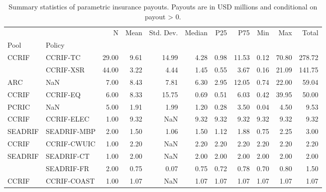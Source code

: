\begin{table}
\caption{Summary statistics of parametric insurance payouts. Payouts are in USD millions and conditional on payout > 0.}
\label{tab:summary_by_pool_policy}
\begin{tabular}{llrrrrrrrrr}
\toprule
 &  & N & Mean & Std. Dev. & Median & P25 & P75 & Min & Max & Total \\
Pool & Policy &  &  &  &  &  &  &  &  &  \\
\midrule
\multirow[t]{2}{*}{CCRIF} & CCRIF-TC & 29.00 & 9.61 & 14.99 & 4.28 & 0.98 & 11.53 & 0.12 & 70.80 & 278.72 \\
 & CCRIF-XSR & 44.00 & 3.22 & 4.44 & 1.45 & 0.55 & 3.67 & 0.16 & 21.09 & 141.75 \\
\cline{1-11}
ARC & NaN & 7.00 & 8.43 & 7.81 & 6.30 & 2.95 & 12.05 & 0.74 & 22.00 & 59.04 \\
\cline{1-11}
CCRIF & CCRIF-EQ & 6.00 & 8.33 & 15.75 & 0.69 & 0.51 & 6.03 & 0.42 & 39.95 & 50.00 \\
\cline{1-11}
PCRIC & NaN & 5.00 & 1.91 & 1.99 & 1.20 & 0.28 & 3.50 & 0.04 & 4.50 & 9.53 \\
\cline{1-11}
CCRIF & CCRIF-ELEC & 1.00 & 9.32 & NaN & 9.32 & 9.32 & 9.32 & 9.32 & 9.32 & 9.32 \\
\cline{1-11}
SEADRIF & SEADRIF-MBP & 2.00 & 1.50 & 1.06 & 1.50 & 1.12 & 1.88 & 0.75 & 2.25 & 3.00 \\
\cline{1-11}
CCRIF & CCRIF-CWUIC & 1.00 & 2.20 & NaN & 2.20 & 2.20 & 2.20 & 2.20 & 2.20 & 2.20 \\
\cline{1-11}
\multirow[t]{2}{*}{SEADRIF} & SEADRIF-CT & 1.00 & 2.00 & NaN & 2.00 & 2.00 & 2.00 & 2.00 & 2.00 & 2.00 \\
 & SEADRIF-FR & 2.00 & 0.75 & 0.07 & 0.75 & 0.72 & 0.78 & 0.70 & 0.80 & 1.50 \\
\cline{1-11}
CCRIF & CCRIF-COAST & 1.00 & 1.07 & NaN & 1.07 & 1.07 & 1.07 & 1.07 & 1.07 & 1.07 \\
\cline{1-11}
\bottomrule
\end{tabular}
\end{table}
